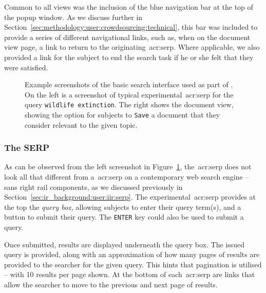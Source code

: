 Common to all views was the inclusion of the blue navigation bar at the top of the popup window. As we discuss further in Section~\ref{sec:methodology:user:crowdsourcing:technical}, this bar was included to provide a series of different navigational links, such as, when on the document view page, a link to return to the originating~\gls{acr:serp}. Where applicable, we also provided a link for the subject to end the search task if he or she felt that they were satisfied.

\begin{figure}[t!]
    \centering
    \caption[Example screenshots of the experimental interfaces]{Example screenshots of the basic search interface used as part of \treconomics. On the left is a screenshot of typical experimental~\gls{acr:serp} for the query \texttt{wildlife extinction}. The right shows the document view, showing the option for subjects to \texttt{Save} a document that they consider relevant to the given topic.}
    \label{fig:interfaces}
\end{figure}

\subsubsection{The SERP}\label{sec:methodology:user:interface:serp}
As can be observed from the left screenshot in Figure~\ref{fig:interfaces}, the~\gls{acr:serp} does not look all that different from a~\gls{acr:serp} on a contemporary web search engine -- sans right rail components, as we discussed previously in Section~\ref{sec:ir_background:user:iir:serp}. The experimental~\gls{acr:serp} provides at the top the \emph{query box,} allowing subjects to enter their query term(s), and a button to submit their query. The \texttt{ENTER} key could also be used to submit a query.

Once submitted, results are displayed underneath the query box. The issued query is provided, along with an approximation of how many pages of results are provided to the searcher for the given query. This hints that pagination is utilised -- with 10 results per page shown. At the bottom of each~\gls{acr:serp} are links that allow the searcher to move to the previous and next page of results.

